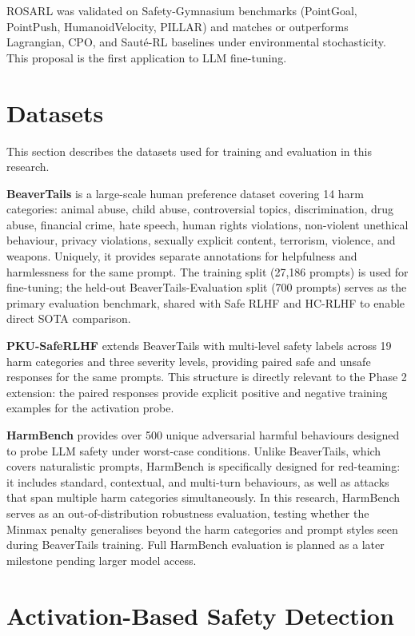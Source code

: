 \documentclass[a4paper,twoside,12pt]{report}
\begin{document}
ROSARL was validated on Safety-Gymnasium benchmarks (PointGoal, PointPush,
HumanoidVelocity, PILLAR) and matches or outperforms Lagrangian, CPO, and Sauté-RL baselines
under environmental stochasticity. This proposal is the first application to LLM fine-tuning.

\section{Datasets}

This section describes the datasets used for training and evaluation in this research.

\textbf{BeaverTails} \citep{ji2023beavertails} is a large-scale human preference dataset
covering 14 harm categories: animal abuse, child abuse, controversial topics, discrimination,
drug abuse, financial crime, hate speech, human rights violations, non-violent unethical
behaviour, privacy violations, sexually explicit content, terrorism, violence, and weapons.
Uniquely, it provides separate annotations for helpfulness and harmlessness for the same
prompt. The training split (27,186 prompts) is used for fine-tuning; the held-out
BeaverTails-Evaluation split (700 prompts) serves as the primary evaluation benchmark,
shared with Safe RLHF and HC-RLHF to enable direct SOTA comparison.

\textbf{PKU-SafeRLHF} \citep{ji2024pkusaferlhf} extends BeaverTails with multi-level safety
labels across 19 harm categories and three severity levels, providing paired safe and unsafe
responses for the same prompts. This structure is directly relevant to the Phase 2 extension:
the paired responses provide explicit positive and negative training examples for the
activation probe.

\textbf{HarmBench} \citep{mazeika2024} provides over 500 unique adversarial harmful
behaviours designed to probe LLM safety under worst-case conditions. Unlike BeaverTails,
which covers naturalistic prompts, HarmBench is specifically designed for red-teaming: it
includes standard, contextual, and multi-turn behaviours, as well as attacks that span
multiple harm categories simultaneously. In this research, HarmBench serves as an
out-of-distribution robustness evaluation, testing whether the Minmax penalty generalises
beyond the harm categories and prompt styles seen during BeaverTails training. Full
HarmBench evaluation is planned as a later milestone pending larger model access.

\section{Activation-Based Safety Detection}
\end{document}
